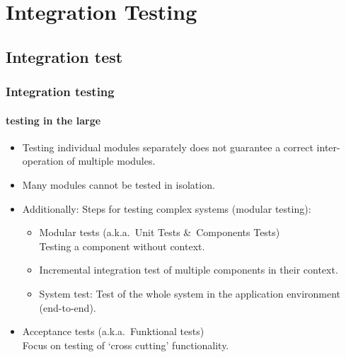 
\section{Integration Testing}


\subsection{Integration test}


\begin{frame}
\frametitle{Integration testing}
\framesubtitle{testing in the large}
\begin{itemize}
  \item Testing individual modules separately does not guarantee a correct inter-operation of multiple modules.
  \item Many modules cannot be tested in isolation.
  \item Additionally: Steps for testing complex systems (modular testing):
    \begin{itemize}
      \item Modular tests (a.k.a.\ Unit Tests \&\ Components Tests)\\
			Testing a component without context.
      \item Incremental integration test of multiple components in their context.
      \item System test: Test of the whole system in the application environment (end-to-end).
    \end{itemize}
	\item Acceptance tests (a.k.a.\ Funktional tests)\\
Focus on testing of `cross cutting' functionality.
\end{itemize}
\end{frame}


